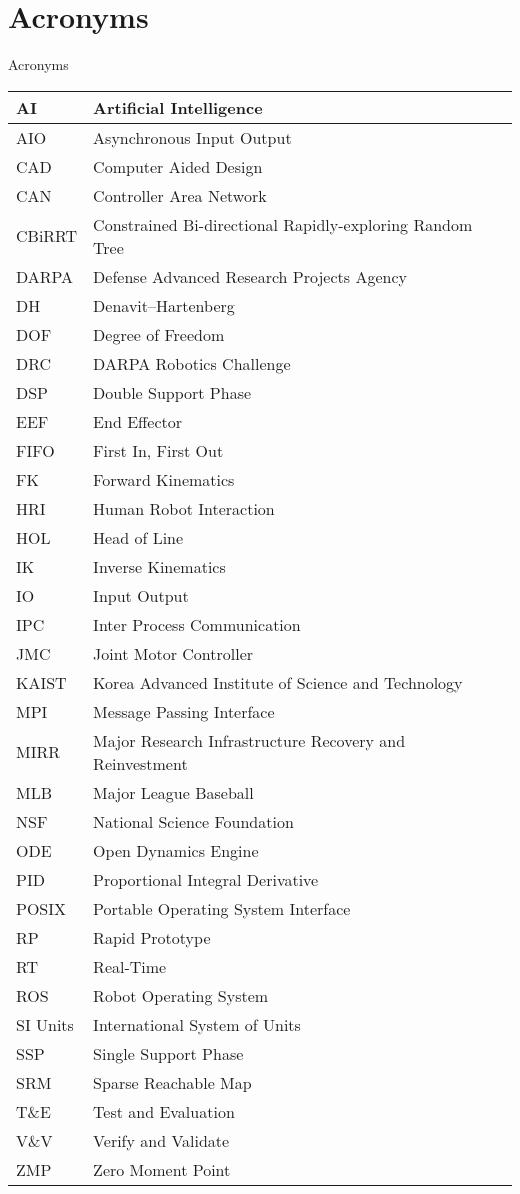 \chapter{Acronyms}
\Large
\centering
Acronyms\\
\normalsize
\begin{longtable}{l | l}
\hline
AI & Artificial Intelligence\\
\hline
AIO & Asynchronous Input Output\\
\hline
CAD & Computer Aided Design\\
\hline
CAN & Controller Area Network \\
\hline
CBiRRT & Constrained Bi-directional Rapidly-exploring Random Tree\\
\hline
DARPA  &  Defense Advanced Research Projects Agency\\
\hline 
DH & Denavit–Hartenberg \\
\hline
DOF & Degree of Freedom \\
\hline
DRC  & DARPA Robotics Challenge \\
\hline
DSP & Double Support Phase\\
\hline
EEF  & End Effector\\
\hline
FIFO & First In, First Out\\
\hline
FK & Forward Kinematics\\
\hline
HRI & Human Robot Interaction\\
\hline
HOL & Head of Line\\
\hline
IK & Inverse Kinematics\\ 
\hline
IO & Input Output\\
\hline
IPC & Inter Process Communication \\
\hline
JMC & Joint Motor Controller\\
\hline
KAIST & Korea Advanced Institute of Science and Technology \\
\hline
MPI & Message Passing Interface\\
\hline
MIRR & Major Research Infrastructure Recovery and Reinvestment\\
\hline
MLB & Major League Baseball\\
\hline
NSF & National Science Foundation \\
\hline
ODE & Open Dynamics Engine\\
\hline
PID & Proportional Integral Derivative\\
\hline
POSIX & Portable Operating System Interface\\
\hline
RP & Rapid Prototype\\
\hline
RT & Real-Time\\
\hline
ROS & Robot Operating System\\
\hline
SI Units & International System of Units\\
\hline
SSP & Single Support Phase\\
\hline
SRM & Sparse Reachable Map \\
\hline
T\&E & Test and Evaluation\\
\hline
V\&V & Verify and Validate \\
\hline 
ZMP & Zero Moment Point\\
\hline
\end{longtable}
